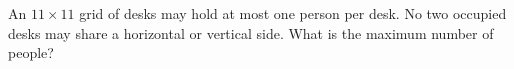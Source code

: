 An $11\times11$ grid of desks may hold at most one person per desk. No two occupied desks may share a horizontal or vertical side. What is the maximum number of people?
